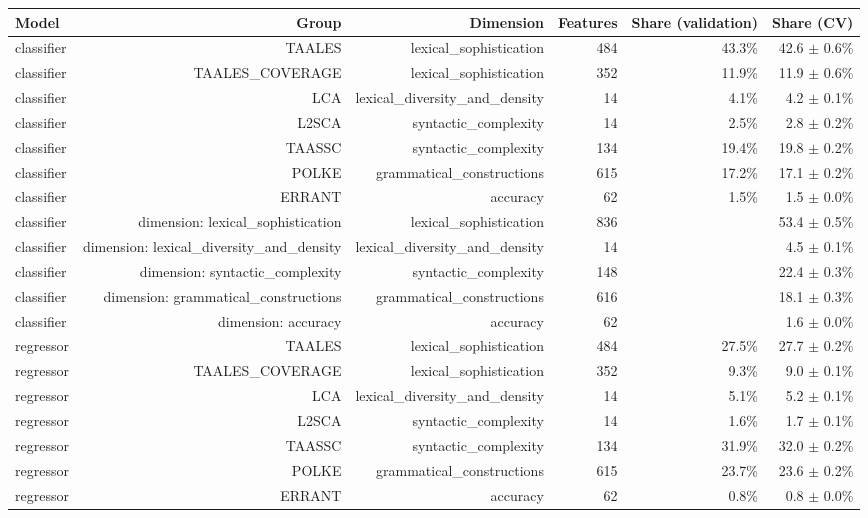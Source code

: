 \begin{table}[t]
\centering
\small
\begin{tabular}{lrrrrr}
\toprule
Model & Group & Dimension & Features & Share (validation) & Share (CV) \\
\midrule
classifier & TAALES & lexical\_sophistication & 484 & 43.3\% & 42.6 $\pm$ 0.6\% \\
classifier & TAALES\_COVERAGE & lexical\_sophistication & 352 & 11.9\% & 11.9 $\pm$ 0.6\% \\
classifier & LCA & lexical\_diversity\_and\_density & 14 & 4.1\% & 4.2 $\pm$ 0.1\% \\
classifier & L2SCA & syntactic\_complexity & 14 & 2.5\% & 2.8 $\pm$ 0.2\% \\
classifier & TAASSC & syntactic\_complexity & 134 & 19.4\% & 19.8 $\pm$ 0.2\% \\
classifier & POLKE & grammatical\_constructions & 615 & 17.2\% & 17.1 $\pm$ 0.2\% \\
classifier & ERRANT & accuracy & 62 & 1.5\% & 1.5 $\pm$ 0.0\% \\
classifier & dimension: lexical\_sophistication & lexical\_sophistication & 836 &  & 53.4 $\pm$ 0.5\% \\
classifier & dimension: lexical\_diversity\_and\_density & lexical\_diversity\_and\_density & 14 &  & 4.5 $\pm$ 0.1\% \\
classifier & dimension: syntactic\_complexity & syntactic\_complexity & 148 &  & 22.4 $\pm$ 0.3\% \\
classifier & dimension: grammatical\_constructions & grammatical\_constructions & 616 &  & 18.1 $\pm$ 0.3\% \\
classifier & dimension: accuracy & accuracy & 62 &  & 1.6 $\pm$ 0.0\% \\
regressor & TAALES & lexical\_sophistication & 484 & 27.5\% & 27.7 $\pm$ 0.2\% \\
regressor & TAALES\_COVERAGE & lexical\_sophistication & 352 & 9.3\% & 9.0 $\pm$ 0.1\% \\
regressor & LCA & lexical\_diversity\_and\_density & 14 & 5.1\% & 5.2 $\pm$ 0.1\% \\
regressor & L2SCA & syntactic\_complexity & 14 & 1.6\% & 1.7 $\pm$ 0.1\% \\
regressor & TAASSC & syntactic\_complexity & 134 & 31.9\% & 32.0 $\pm$ 0.2\% \\
regressor & POLKE & grammatical\_constructions & 615 & 23.7\% & 23.6 $\pm$ 0.2\% \\
regressor & ERRANT & accuracy & 62 & 0.8\% & 0.8 $\pm$ 0.0\% \\

\end{tabular}
\end{table}
